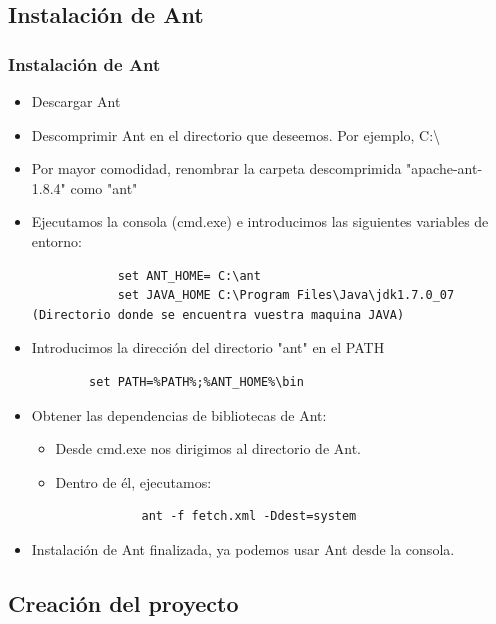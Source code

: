 \documentclass[24pt, a4paper, oneside, spanish]{beamer}
\begin{document}
\subsection{Instalación de Ant}
\begin{frame}
	\frametitle{Instalación de Ant}
	
	\begin{itemize}
		\item Descargar Ant
		\item Descomprimir Ant en el directorio que deseemos. Por ejemplo, C:\textbackslash
		\item Por mayor comodidad, renombrar la carpeta descomprimida "apache-ant-1.8.4" como "ant"
		\item Ejecutamos la consola (cmd.exe) e introducimos las siguientes variables de entorno:
			\begin{lstlisting}
			set ANT_HOME= C:\ant
			set JAVA_HOME C:\Program Files\Java\jdk1.7.0_07 (Directorio donde se encuentra vuestra maquina JAVA)
			\end{lstlisting}	
		
		\item Introducimos la dirección del directorio "ant" en el PATH
		\begin{lstlisting}
		set PATH=%PATH%;%ANT_HOME%\bin
		\end{lstlisting}
		
		\item Obtener las dependencias de bibliotecas de Ant:
		\begin{itemize}
			\item Desde cmd.exe nos dirigimos al directorio de Ant.
			\item Dentro de él, ejecutamos:
			\begin{lstlisting}
			ant -f fetch.xml -Ddest=system
			\end{lstlisting}
		\end{itemize}
	
		\item Instalación de Ant finalizada, ya podemos usar Ant desde la consola.	
	\end{itemize}
\end{frame}

\subsection{Creación del proyecto}
\end{document}

